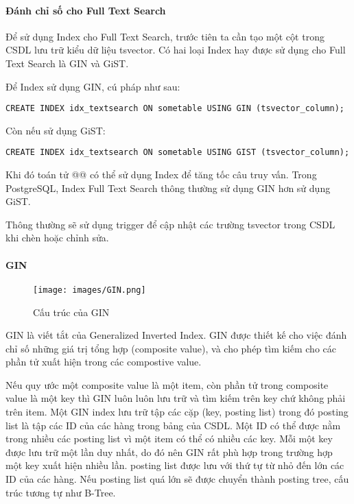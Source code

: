 \paragraph{Đánh chỉ số cho Full Text Search}
Để sử dụng Index cho Full Text Search, trước tiên ta cần tạo
một cột trong CSDL lưu trữ kiểu dữ liệu tsvector.
Có hai loại Index hay được sử dụng cho Full Text Search là GIN và GiST. 

\noindent Để Index sử dụng GIN, cú pháp như sau:
\begin{lstlisting}[caption={Tạo index sử dụng GIN},captionpos=b]
CREATE INDEX idx_textsearch ON sometable USING GIN (tsvector_column);
\end{lstlisting}

\noindent Còn nếu sử dụng GiST:
\begin{lstlisting}[caption={Tạo index sử dụng GiST},captionpos=b]
CREATE INDEX idx_textsearch ON sometable USING GIST (tsvector_column);
\end{lstlisting}

Khi đó toán tử @@ có thể sử dụng Index để
tăng tốc câu truy vấn. Trong PostgreSQL, Index Full Text Search
thông thường sử dụng GIN hơn sử dụng GiST. 

Thông thường sẽ sử dụng trigger để cập nhật các trường
tsvector trong CSDL khi chèn hoặc chỉnh sửa.

\paragraph{GIN}
\begin{figure}[H]
\centering
\texttt{[image: images/GIN.png]}
\caption{Cấu trúc của GIN}
\end{figure}

GIN là viết tắt của Generalized Inverted Index. GIN được thiết
kế cho việc đánh chỉ số những giá trị tổng hợp (composite value),
và cho phép tìm kiếm cho các phần tử xuất hiện
trong các compostive value. 

Nếu quy ước một composite value là một item, còn phần tử trong
composite value là một key thì GIN 
luôn luôn lưu trữ và tìm kiếm trên key chứ không phải trên item.
Một GIN index lưu trữ tập các cặp (key, posting list) trong đó
posting list là tập các ID của các hàng trong bảng của CSDL.
Một ID có thể được nằm trong nhiều các posting list vì một
item có thể có nhiều các key. Mỗi một key được lưu trữ một
lần duy nhất, do đó nên GIN rất phù hợp trong trường hợp một
key xuất hiện nhiều lần. posting list được lưu với thứ tự
từ nhỏ đến lớn các ID của các hàng. Nếu posting list quá lớn
sẽ được chuyển thành posting tree, cấu trúc tương tự như B-Tree. 
